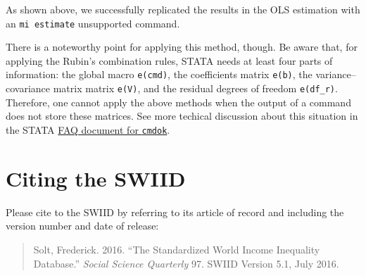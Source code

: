 \documentclass[11pt,]{article}
\theoremstyle{definition}
\theoremstyle{definition}
\theoremstyle{remark}
\begin{document}
As shown above, we successfully replicated the results in the OLS
estimation with an \texttt{mi\ estimate} unsupported command.

There is a noteworthy point for applying this method, though. Be aware
that, for applying the Rubin's combination rules, STATA needs at least
four parts of information: the global macro \texttt{e(cmd)}, the
coefficients matrix \texttt{e(b)}, the variance--covariance matrix
matrix \texttt{e(V)}, and the residual degrees of freedom
\texttt{e(df\_r)}. Therefore, one cannot apply the above methods when
the output of a command does not store these matrices. See more techical
discussion about this situation in the STATA
\href{http://www.stata.com/support/faqs/statistics/cmdok-option/\#tech}{FAQ
document for \texttt{cmdok}}.

\section{Citing the SWIID}\label{citing-the-swiid}

Please cite to the SWIID by referring to its article of record and
including the version number and date of release:

\begin{quote}
Solt, Frederick. 2016. ``The Standardized World Income Inequality
Database.'' \emph{Social Science Quarterly} 97. SWIID Version 5.1, July
2016.
\end{quote}

\newpage
\singlespacing 

\end{document}
